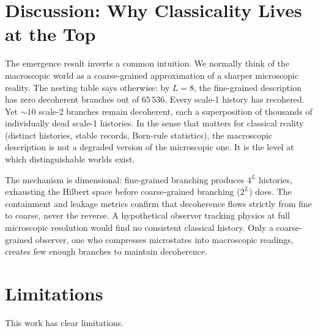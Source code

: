 \documentclass[aps,prd,twocolumn,showpacs,preprintnumbers,amsmath,amssymb,nofootinbib]{revtex4-2}
\begin{document}
\section{Discussion: Why Classicality Lives at the Top}
\label{sec:discussion}

The emergence result inverts a common intuition.  We normally think of the
macroscopic world as a coarse-grained approximation of a sharper microscopic
reality.  The nesting table says otherwise: by $L = 8$, the fine-grained
description has zero decoherent branches out of $65\,536$.  Every scale-1
history has recohered.  Yet $\sim\!10$ scale-2 branches remain decoherent,
each a superposition of thousands of individually dead scale-1 histories.
In the sense that matters for classical reality (distinct histories, stable
records, Born-rule statistics), the macroscopic description is not a degraded
version of the microscopic one.  It is the level at which distinguishable
worlds exist.

The mechanism is dimensional: fine-grained branching produces $4^L$ histories,
exhausting the Hilbert space before coarse-grained branching ($2^L$) does.
The containment and leakage metrics confirm that decoherence flows strictly
from fine to coarse, never the reverse.  A hypothetical observer tracking
physics at full microscopic resolution would find no consistent classical
history.  Only a coarse-grained observer, one who compresses microstates into
macroscopic readings, creates few enough branches to maintain decoherence.


\section{Limitations}
\label{sec:limitations}

This work has clear limitations.
\end{document}

